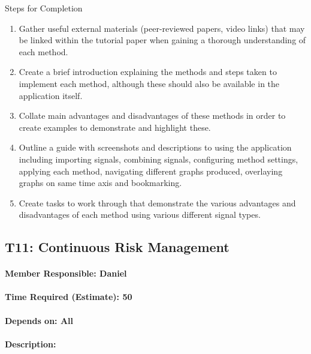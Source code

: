 \documentclass[
  english,
  paper=a4,
  oneside  ,captions=tableheading
]{scrbook}
\begin{document}
Steps for Completion 
\begin{enumerate}
	\item Gather useful external materials (peer-reviewed papers, video links) that may be linked within the tutorial paper when gaining a thorough understanding of each method.
	\item Create a brief introduction explaining the methods and steps taken to implement each method, although these should also be available in the application itself.
	\item Collate main advantages and disadvantages of these methods in order to create examples to demonstrate and highlight these.
	\item Outline a guide with screenshots and descriptions to using the application including importing signals, combining signals, configuring method settings, applying each method, navigating different graphs produced, overlaying graphs on same time axis and bookmarking.
	\item Create tasks to work through that demonstrate the various advantages and disadvantages of each method using various different signal types.
\end{enumerate}

\newpage
\hypertarget{t11-continuous-risk-management}{%
\subsection{T11: Continuous Risk
Management}\label{t11-continuous-risk-management}}

\hypertarget{member-responsible-daniel}{%
\paragraph{Member Responsible: Daniel}\label{member-responsible-daniel}}

\hypertarget{time-required-estimate-50}{%
\paragraph{Time Required (Estimate):
50}\label{time-required-estimate-50}}

\hypertarget{depends-on-all-1}{%
\paragraph{Depends on: All}\label{depends-on-all-1}}

\hypertarget{description-9}{%
\paragraph{Description:}\label{description-9}}
\end{document}
